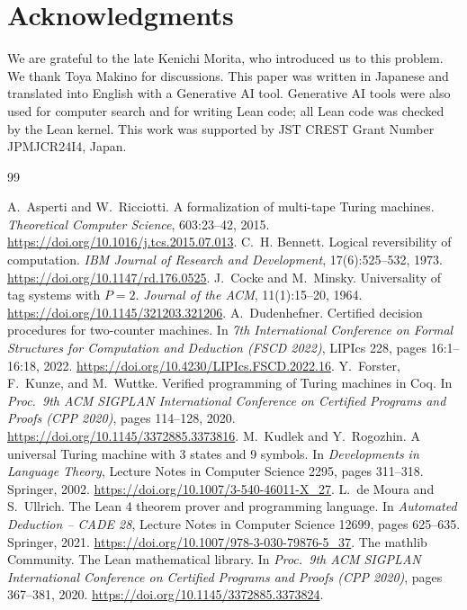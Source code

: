 \documentclass{article}
\theoremstyle{definition}
\theoremstyle{remark}
\begin{document}
\section*{Acknowledgments}
We are grateful to the late Kenichi Morita, who introduced us to this problem.
We thank Toya Makino for discussions.
This paper was written in Japanese and translated into English with a Generative AI tool.
Generative AI tools were also used for computer search and for writing Lean code; all Lean code was checked by the Lean kernel.
This work was supported by JST CREST Grant Number JPMJCR24I4, Japan.

\begin{thebibliography}{99}
\raggedright
{} A.~Asperti and W.~Ricciotti. A formalization of multi-tape Turing machines. \textit{Theoretical Computer Science}, 603:23--42, 2015. \url{https://doi.org/10.1016/j.tcs.2015.07.013}.
 C.~H. Bennett. Logical reversibility of computation. \textit{IBM Journal of Research and Development}, 17(6):525--532, 1973. \url{https://doi.org/10.1147/rd.176.0525}.
 J.~Cocke and M.~Minsky. Universality of tag systems with $P=2$. \textit{Journal of the ACM}, 11(1):15--20, 1964. \url{https://doi.org/10.1145/321203.321206}.
 A.~Dudenhefner. Certified decision procedures for two-counter machines. In \textit{7th International Conference on Formal Structures for Computation and Deduction (FSCD 2022)}, LIPIcs 228, pages 16:1--16:18, 2022. \url{https://doi.org/10.4230/LIPIcs.FSCD.2022.16}.
 Y.~Forster, F.~Kunze, and M.~Wuttke. Verified programming of Turing machines in Coq. In \textit{Proc.\ 9th ACM SIGPLAN International Conference on Certified Programs and Proofs (CPP 2020)}, pages 114--128, 2020. \url{https://doi.org/10.1145/3372885.3373816}.
 M.~Kudlek and Y.~Rogozhin. A universal Turing machine with 3 states and 9 symbols. In \textit{Developments in Language Theory}, Lecture Notes in Computer Science 2295, pages 311--318. Springer, 2002. \url{https://doi.org/10.1007/3-540-46011-X_27}.
 L.~de Moura and S.~Ullrich. The Lean 4 theorem prover and programming language. In \textit{Automated Deduction -- CADE 28}, Lecture Notes in Computer Science 12699, pages 625--635. Springer, 2021. \url{https://doi.org/10.1007/978-3-030-79876-5_37}.
 The mathlib Community. The Lean mathematical library. In \textit{Proc.\ 9th ACM SIGPLAN International Conference on Certified Programs and Proofs (CPP 2020)}, pages 367--381, 2020. \url{https://doi.org/10.1145/3372885.3373824}.

\end{thebibliography}
\end{document}
